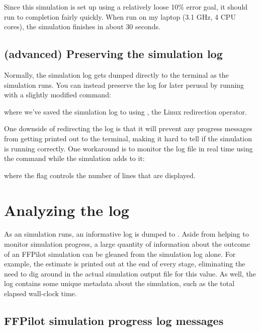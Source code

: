 {Since this simulation is set up using a relatively loose 10\% error goal, it should run to completion fairly quickly. When run on my laptop (3.1 GHz, 4 CPU cores), the simulation finishes in about 30 seconds.

\subsection{(advanced) Preserving the simulation log}
Normally, the  simulation log gets dumped directly to the terminal as the simulation runs. You can instead preserve the log for later perusal by running  with a slightly modified command:


where we've saved the simulation log to \pth{\lmlogpath} using \sh{>}, the Linux redirection operator.

One downside of redirecting the log is that it will prevent any progress messages from getting printed out to the terminal, making it hard to tell if the simulation is running correctly. One workaround is to monitor the log file in real time using the  command while the simulation adds to it:


where the  flag controls the number of lines that are displayed.

\section{Analyzing the log}

As an  simulation runs, an informative log is dumped to . Aside from helping to monitor simulation progress, a large quantity of information about the outcome of an FFPilot simulation can be gleaned from the simulation log alone. For example, the  estimate is printed out at the end of every stage, eliminating the need to dig around in the actual simulation output file for this value. As well, the log contains some unique metadata about the simulation, such as the total elapsed wall-clock time.

\subsection{FFPilot simulation progress log messages}

}
